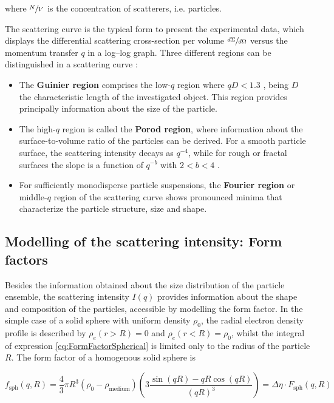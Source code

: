 where $\sfrac{N}{V}$ is the concentration of scatterers, i.e. particles.

The scattering curve is the typical form to present the experimental data, which displays the differential scattering cross-section per volume $\sfrac{d\Sigma}{d\Omega}$ versus the momentum transfer $q$ in a log–log graph. Three different regions can be distinguished in a scattering curve \citep{schnablegger_practical_2006}: 

\begin{itemize}
        \item The \textbf{Guinier region} comprises the low-$q$ region where $qD<1.3$ \citep{feigin_structure_1987}, being $D$ the characteristic length of the investigated object. This region provides principally information about the size of the particle.
        \item The high-$q$ region is called the \textbf{Porod region}, where information about the surface-to-volume ratio of the particles can be derived. For a smooth particle surface, the scattering intensity decays as $q^{-4}$, while for rough or fractal surfaces the slope is a function of $q^{-b}$ with $2<b<4$ \citep{walenta_small_1985-1}.
        \item For sufficiently monodisperse particle suspensions, the \textbf{Fourier region} or middle-$q$ region of the scattering curve shows pronounced minima that characterize the particle structure, size and shape.

\end{itemize}

\subsection{Modelling of the scattering intensity: Form factors}

Besides the information obtained about the size distribution of the particle ensemble, the scattering intensity $I(q)$ provides information about the shape and composition of the particles, accessible by modelling the form factor. In the simple case of a solid sphere with uniform density $\rho_0$, the radial electron density profile is described by $\rho_e(r>R)=0$ and $\rho_e(r<R)=\rho_0$, whilst the integral of expression \ref{eq:FormFactorSpherical} is limited only to the radius of the particle $R$. The form factor of a homogenous solid sphere is 

\begin{equation}
        \label{eq:ff_sphere}
       f_{\text{sph}}(q,R)=\frac{4}{3}\pi R^3 \left( \rho_0 - \rho_{\text{medium}} \right) \left( 3\frac{\sin(qR)-qR\cos(qR)}{\left( qR \right)^3} \right) = \Delta \eta \cdot F_{\text{sph}}(q,R)
\end{equation}

